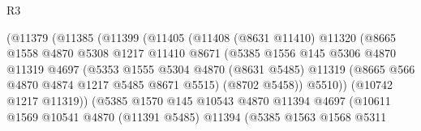 \begin{lexlean}{R3}
\begin{coremodule}
                                  (@11379
                                    (@11385
                                      (@11399
                                        (@11405
                                          (@11408
                                            (@8631 @11410)
                                            @11320
                                            (@8665
                                              @1558
                                              @4870
                                              @5308
                                              @1217
                                              @11410
                                              @8671
                                              (@5385
                                                @1556
                                                @145
                                                @5306
                                                @4870
                                                @11319
                                                @4697
                                                (@5353
                                                  @1555
                                                  @5304
                                                  @4870
                                                  (@8631 @5485)
                                                  @11319
                                                  (@8665 @566 @4870 @4874 @1217 @5485 @8671 @5515)
                                                  (@8702 @5458))
                                                @5510))
                                            (@10742 @1217 @11319))
                                          (@5385
                                            @1570
                                            @145
                                            @10543
                                            @4870
                                            @11394
                                            @4697
                                            (@10611
                                              @1569
                                              @10541
                                              @4870
                                              (@11391 @5485)
                                              @11394
                                              (@5385
                                                @1563
                                                @1568
                                                @5311

\end{coremodule}
\end{lexlean}
